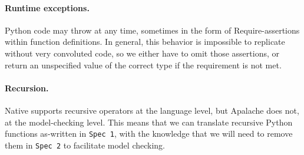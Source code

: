 \paragraph{Runtime exceptions.} Python code may throw at any time, sometimes in the form of $\mathrm{Require}$-assertions within function definitions. 
In general, this behavior is impossible to replicate without very convoluted \tlap{} code, so we either have to omit those assertions, or return an unspecified value of the correct type if the requirement is not met.

\paragraph{Recursion.} Native \tlap{} supports recursive operators at the language level, but Apalache does not, at the model-checking level. This means that we can translate recursive Python functions as-written in \texttt{Spec 1}, with the knowledge that we will need to remove them in \texttt{Spec 2} to facilitate model checking.

